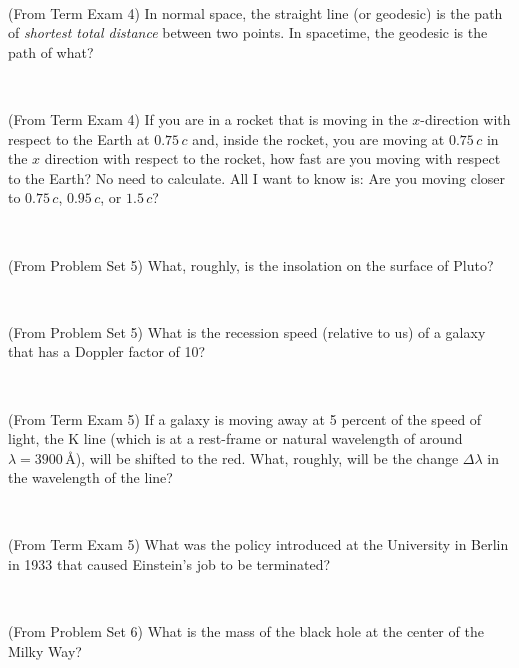 \documentclass[12pt, letterpaper]{article}
\begin{document}
\vfill ~

\begin{problem}
  (From Term Exam 4)
  In normal space, the straight line (or geodesic) is the path of \emph{shortest
total distance} between two points. In spacetime, the geodesic is the path
of what?
\end{problem}

\vfill ~

\begin{problem}
  (From Term Exam 4)
  If you are in a rocket that is moving in the $x$-direction with
respect to the Earth at $0.75\,c$ and, inside the rocket, you are
moving at $0.75\,c$ in the $x$ direction with respect to the rocket,
how fast are you moving with respect to the Earth? No need to
calculate. All I want to know is: Are you moving closer to $0.75\,c$,
$0.95\,c$, or $1.5\,c$?
\end{problem}

\vfill ~

\clearpage

\begin{problem}
  (From Problem Set 5)
  What, roughly, is the insolation on the surface of Pluto?
\end{problem}

\vfill ~

\begin{problem}
  (From Problem Set 5)
  What is the recession speed (relative to us) of a galaxy that has a Doppler
  factor of 10?
\end{problem}

\vfill ~

\begin{problem}
  (From Term Exam 5)
  If a galaxy is moving away at 5 percent of the speed of light, the K
line (which is at a rest-frame or natural wavelength of around $\lambda =
3900$\,\AA), will be shifted to the red. What, roughly, will be the change
$\Delta\lambda$ in the wavelength of the line?
\end{problem}

\vfill ~

\begin{problem}
  (From Term Exam 5)
  What was the policy introduced at the University in Berlin in 1933 that caused Einstein's job to be terminated?
\end{problem}

\vfill ~

\clearpage

\begin{problem}
  (From Problem Set 6)
  What is the mass of the black hole at the center of the Milky Way?
\end{problem}
\end{document}
